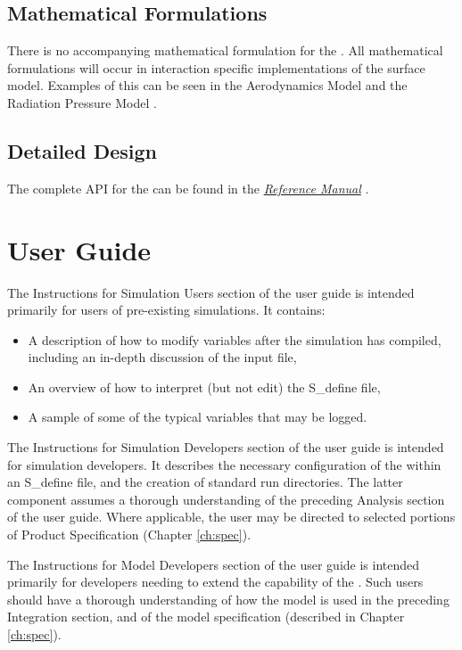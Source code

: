 \section{Mathematical Formulations}

There is no accompanying mathematical formulation for the \ModelDesc.
All mathematical formulations will occur in interaction specific 
implementations of the surface model. Examples of this can be seen in
the Aerodynamics Model \cite{dynenv:AERODYNAMICS} and the Radiation Pressure
Model \cite{dynenv:RADIATIONPRESSURE}.

\section{Detailed Design}

The complete API for the \ModelDesc can be found
in the  \href{file:refman.pdf} {\em Reference Manual}
\cite{surfacemodelbib:ReferenceManual}.

\clearpage
\boilerplateinventory

\chapter{User Guide}\label{ch:user}
The Instructions for Simulation Users section of the user guide is intended primarily for users of pre-existing simulations.  
It contains: 
\begin{itemize}
\item A description of how to modify \ModelDesc variables after the simulation 
has compiled, including an in-depth discussion of the input file,
\item An overview of how to interpret (but not edit) the S\_define file,
\item A sample of some of the typical variables that may be logged.
\end{itemize}

The Instructions for Simulation Developers section of the user guide is intended for simulation developers.  
It describes the necessary configuration of the \ModelDesc within an 
S\_define file, and the creation of standard run directories.  The latter 
component assumes a thorough understanding of the preceding Analysis section of the user guide.
Where applicable, the user may be directed to selected portions of Product Specification (Chapter \ref{ch:spec}).

The Instructions for Model Developers section of the user guide is intended primarily for developers 
needing to extend the capability of the \ModelDesc.  Such users should have a 
thorough understanding of how the model is used in the preceding 
Integration section, and of the model 
specification (described in Chapter \ref{ch:spec}).

